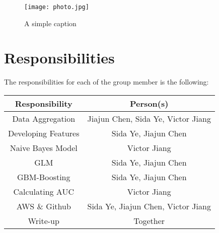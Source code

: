 \documentclass[12pt]{article}
\begin{document}
\begin{figure}[ht!]
\centering
\texttt{[image: photo.jpg]}
\caption{A simple caption \label{overflow}}
\end{figure}



\section{Responsibilities}

The responsibilities  for each of the group member is the following:\\

\begin{table}[h]
\large
\begin{tabular}{| c | c |}
\hline
Responsibility & Person(s)\\
\hline
Data Aggregation & Jiajun Chen, Sida Ye, Victor Jiang\\
\hline
Developing Features & Sida Ye, Jiajun Chen\\
\hline
Naive Bayes Model & Victor Jiang\\
\hline
GLM & Sida Ye, Jiajun Chen\\
\hline
GBM-Boosting & Sida Ye, Jiajun Chen\\
\hline
Calculating AUC & Victor Jiang\\
\hline
AWS \& Github & Sida Ye, Jiajun Chen, Victor Jiang\\
\hline
Write-up& Together\\
\hline
\end{tabular}\\
\end{table}
\end{document}
